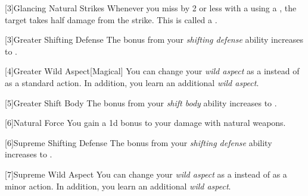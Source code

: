         [3]{Glancing Natural Strikes} Whenever you miss by 2 or less with a  using a , the target takes half damage from the strike.
        This is called a .

        [3]{Greater Shifting Defense}
        The bonus from your \textit{shifting defense} ability increases to .

        [4]{Greater Wild Aspect}[Magical] You can change your \textit{wild aspect} as a  instead of as a standard action.
        In addition, you learn an additional \textit{wild aspect}.

        [5]{Greater Shift Body} The bonus from your \textit{shift body} ability increases to .

        [6]{Natural Force} You gain a \plus1d bonus to your damage with natural weapons.

        [6]{Supreme Shifting Defense}
        The bonus from your \textit{shifting defense} ability increases to .

        [7]{Supreme Wild Aspect} You can change your \textit{wild aspect} as a  instead of as a minor action.
        In addition, you learn an additional \textit{wild aspect}.



